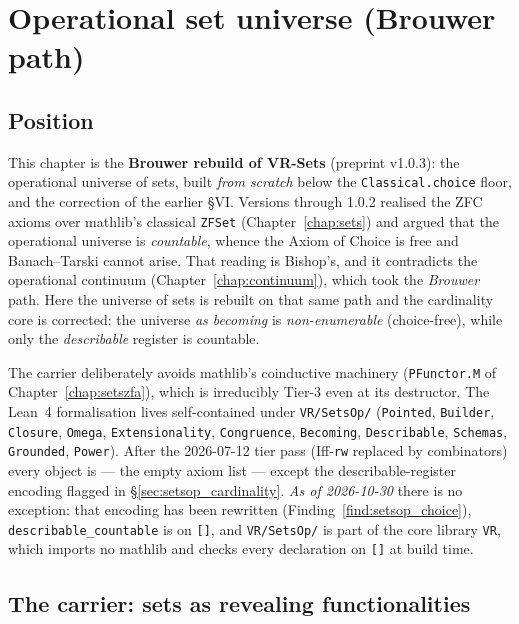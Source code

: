 \chapter{Operational set universe (Brouwer path)}
\label{chap:setsop}

\section{Position}
\label{sec:setsop_position}

This chapter is the \textbf{Brouwer rebuild of VR-Sets} (preprint v1.0.3): the
operational universe of sets, built \emph{from scratch} below the
\texttt{Classical.choice} floor, and the correction of the earlier \S VI.
Versions through 1.0.2 realised the ZFC axioms over mathlib's classical
\texttt{ZFSet} (Chapter~\ref{chap:sets}) and argued that the operational
universe is \emph{countable}, whence the Axiom of Choice is free and
Banach--Tarski cannot arise.  That reading is Bishop's, and it contradicts the
operational continuum (Chapter~\ref{chap:continuum}), which took the
\emph{Brouwer} path.  Here the universe of sets is rebuilt on that same path and
the cardinality core is corrected: the universe \emph{as becoming} is
\emph{non-enumerable} (choice-free), while only the \emph{describable} register
is countable.

The carrier deliberately avoids mathlib's coinductive machinery
(\texttt{PFunctor.M} of Chapter~\ref{chap:setszfa}), which is irreducibly
Tier-3 even at its destructor.  The Lean~4 formalisation lives self-contained
under \texttt{VR/SetsOp/} (\texttt{Pointed}, \texttt{Builder},
\texttt{Closure}, \texttt{Omega}, \texttt{Extensionality}, \texttt{Congruence},
\texttt{Becoming}, \texttt{Describable}, \texttt{Schemas}, \texttt{Grounded},
\texttt{Power}).
After the 2026-07-12 tier pass (Iff-\texttt{rw} replaced by combinators)
every object is \axiomprofile{[]} --- the empty axiom list --- except the
describable-register encoding flagged in \S\ref{sec:setsop_cardinality}.
\emph{As of 2026-10-30} there is no exception: that encoding has been rewritten
(Finding~\ref{find:setsop_choice}), \texttt{describable\_countable} is on \texttt{[]}, and
\texttt{VR/SetsOp/} is part of the core library \texttt{VR}, which imports no mathlib and
checks every declaration on \texttt{[]} at build time.

\section{The carrier: sets as revealing functionalities}
\label{sec:setsop_carrier}

